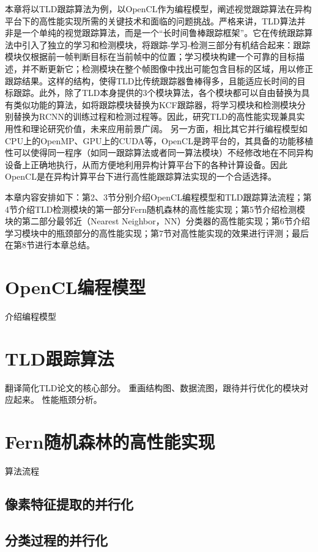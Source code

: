 本章将以TLD跟踪算法为例，以OpenCL作为编程模型，阐述视觉跟踪算法在异构平台下的高性能实现所需的关键技术和面临的问题挑战。严格来讲，TLD算法并非是一个单纯的视觉跟踪算法，而是一个``长时间鲁棒跟踪框架''。它在传统跟踪算法中引入了独立的学习和检测模块，将跟踪-学习-检测三部分有机结合起来：跟踪模块仅根据前一帧判断目标在当前帧中的位置；学习模块构建一个可靠的目标描述，并不断更新它；检测模块在整个帧图像中找出可能包含目标的区域，用以修正跟踪结果。这样的结构，使得TLD比传统跟踪器鲁棒得多，且能适应长时间的目标跟踪。此外，除了TLD本身提供的3个模块算法，各个模块都可以自由替换为具有类似功能的算法，如将跟踪模块替换为KCF跟踪器，将学习模块和检测模块分别替换为RCNN的训练过程和检测过程等。因此，研究TLD的高性能实现兼具实用性和理论研究价值，未来应用前景广阔。
另一方面，相比其它并行编程模型如CPU上的OpenMP、GPU上的CUDA等，OpenCL是跨平台的，其具备的功能移植性可以使得同一程序（如同一跟踪算法或者同一算法模块）不经修改地在不同异构设备上正确地执行，从而方便地利用异构计算平台下的各种计算设备。因此OpenCL是在异构计算平台下进行高性能跟踪算法实现的一个合适选择。

本章内容安排如下：第2、3节分别介绍OpenCL编程模型和TLD跟踪算法流程；第4节介绍TLD检测模块的第一部分\pozhehao Fern随机森林的高性能实现；第5节介绍检测模块的第二部分\pozhehao 最邻近（Nearest Neighbor，NN）分类器的高性能实现；第6节介绍学习模块中的瓶颈部分的高性能实现；第7节对高性能实现的效果进行评测；最后在第8节进行本章总结。

\section{OpenCL编程模型}
介绍编程模型

\section{TLD跟踪算法}
翻译简化TLD论文的核心部分。
重画结构图、数据流图，跟待并行优化的模块对应起来。
性能瓶颈分析。

\section{Fern随机森林的高性能实现}
算法流程
\subsection{像素特征提取的并行化}
\subsection{分类过程的并行化}
